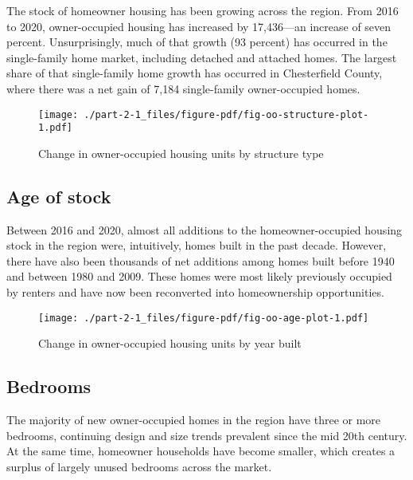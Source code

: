 \documentclass[
  letterpaper,
  DIV=11,
  numbers=noendperiod]{scrreprt}
\begin{document}
The stock of homeowner housing has been growing across the region. From
2016 to 2020, owner-occupied housing has increased by 17,436---an
increase of seven percent. Unsurprisingly, much of that growth (93
percent) has occurred in the single-family home market, including
detached and attached homes. The largest share of that single-family
home growth has occurred in Chesterfield County, where there was a net
gain of 7,184 single-family owner-occupied homes.

\begin{figure}

{\centering \texttt{[image: ./part-2-1\_files/figure-pdf/fig-oo-structure-plot-1.pdf]}

}

\caption{\label{fig-oo-structure-plot}Change in owner-occupied housing
units by structure type}

\end{figure}

\hypertarget{age-of-stock}{%
\subsection{Age of stock}\label{age-of-stock}}

Between 2016 and 2020, almost all additions to the homeowner-occupied
housing stock in the region were, intuitively, homes built in the past
decade. However, there have also been thousands of net additions among
homes built before 1940 and between 1980 and 2009. These homes were most
likely previously occupied by renters and have now been reconverted into
homeownership opportunities.

\begin{figure}

{\centering \texttt{[image: ./part-2-1\_files/figure-pdf/fig-oo-age-plot-1.pdf]}

}

\caption{\label{fig-oo-age-plot}Change in owner-occupied housing units
by year built}

\end{figure}

\hypertarget{bedrooms}{%
\subsection{Bedrooms}\label{bedrooms}}

The majority of new owner-occupied homes in the region have three or
more bedrooms, continuing design and size trends prevalent since the mid
20th century. At the same time, homeowner households have become
smaller, which creates a surplus of largely unused bedrooms across the
market.
\end{document}
